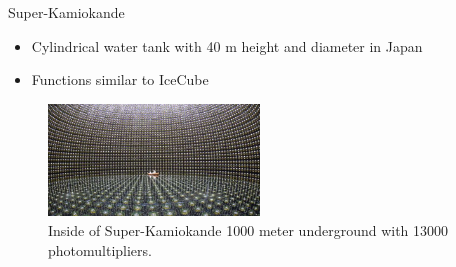 \documentclass[aspectratio=1610, 10pt]{beamer}
\begin{document}
\begin{frame}{Super-Kamiokande}
  \begin{itemize}
    \item Cylindrical water tank with 40 m height and diameter in Japan
    \medskip
    \item Functions similar to IceCube
  \end{itemize}
  \begin{figure}
    \includegraphics[width=0.5\textwidth]{images/kamiokande.png}
    \caption{Inside of Super-Kamiokande 1000 meter underground with 13000 photomultipliers.}
  \end{figure}
\end{frame}
\end{document}
